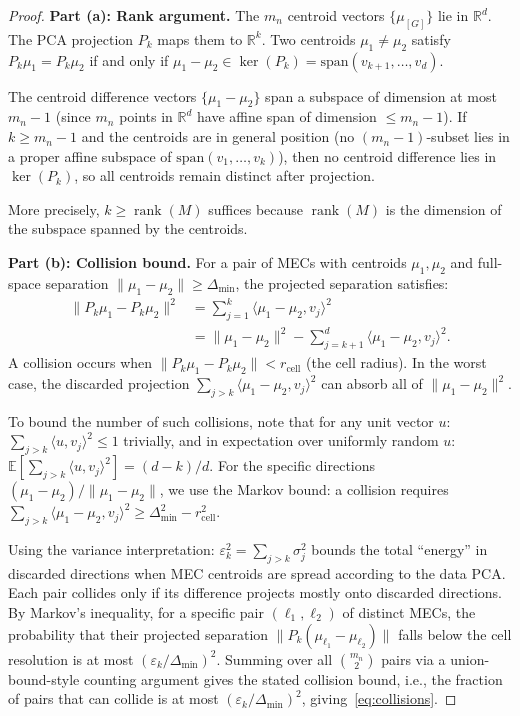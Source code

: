 \documentclass{article}
\theoremstyle{definition}
\theoremstyle{plain}
\theoremstyle{remark}
\DeclareMathOperator{\rank}{rank}
\begin{document}
\begin{proof}
\textbf{Part (a): Rank argument.}
The $m_n$ centroid vectors $\{\mu_{[G]}\}$ lie in $\mathbb{R}^d$. The PCA
projection $P_k$ maps them to $\mathbb{R}^k$. Two centroids
$\mu_1 \neq \mu_2$ satisfy $P_k\mu_1 = P_k\mu_2$ if and only if
$\mu_1 - \mu_2 \in \ker(P_k) = \text{span}(v_{k+1}, \ldots, v_d)$.

The centroid difference vectors $\{\mu_1 - \mu_2\}$ span a subspace of
dimension at most $m_n - 1$ (since $m_n$ points in $\mathbb{R}^d$ have affine
span of dimension $\leq m_n - 1$). If $k \geq m_n - 1$ and the centroids are
in general position (no $(m_n - 1)$-subset lies in a proper affine subspace of
$\text{span}(v_1, \ldots, v_k)$), then no centroid difference lies in
$\ker(P_k)$, so all centroids remain distinct after projection.

More precisely, $k \geq \rank(M)$ suffices because $\rank(M)$ is the
dimension of the subspace spanned by the centroids.

\textbf{Part (b): Collision bound.}
For a pair of MECs with centroids $\mu_1, \mu_2$ and full-space separation
$\|\mu_1 - \mu_2\| \geq \Delta_{\min}$, the projected separation satisfies:
\begin{align}
  \|P_k\mu_1 - P_k\mu_2\|^2
  &= \sum_{j=1}^k \langle \mu_1 - \mu_2, v_j \rangle^2 \\
  &= \|\mu_1 - \mu_2\|^2 - \sum_{j=k+1}^d \langle \mu_1 - \mu_2, v_j \rangle^2.
\end{align}
A collision occurs when $\|P_k\mu_1 - P_k\mu_2\| < r_{\text{cell}}$ (the cell
radius). In the worst case, the discarded projection
$\sum_{j>k}\langle \mu_1 - \mu_2, v_j\rangle^2$ can absorb all of
$\|\mu_1 - \mu_2\|^2$.

To bound the number of such collisions, note that for any unit vector $u$:
$\sum_{j>k}\langle u, v_j\rangle^2 \leq 1$ trivially, and in expectation over
uniformly random $u$:
$\mathbb{E}[\sum_{j>k}\langle u, v_j\rangle^2] = (d-k)/d$.
For the specific directions $(\mu_1 - \mu_2)/\|\mu_1 - \mu_2\|$, we use the
Markov bound: a collision requires
$\sum_{j>k}\langle \mu_1 - \mu_2, v_j\rangle^2 \geq \Delta_{\min}^2 - r_{\text{cell}}^2$.

Using the variance interpretation: $\varepsilon_k^2 = \sum_{j>k}\sigma_j^2$
bounds the total ``energy'' in discarded directions when MEC centroids are spread
according to the data PCA. Each pair collides only if its difference projects
mostly onto discarded directions. By Markov's inequality, for a specific pair $(\ell_1, \ell_2)$ of distinct MECs, the probability that their projected separation $\|P_k(\mu_{\ell_1} - \mu_{\ell_2})\|$ falls below the cell resolution is at most $(\varepsilon_k / \Delta_{\min})^2$. Summing over all $\binom{m_n}{2}$ pairs via a union-bound-style counting argument gives the stated collision bound, i.e., the fraction of pairs that can collide is at most
$(\varepsilon_k/\Delta_{\min})^2$, giving~\eqref{eq:collisions}.


\end{proof}
\end{document}
